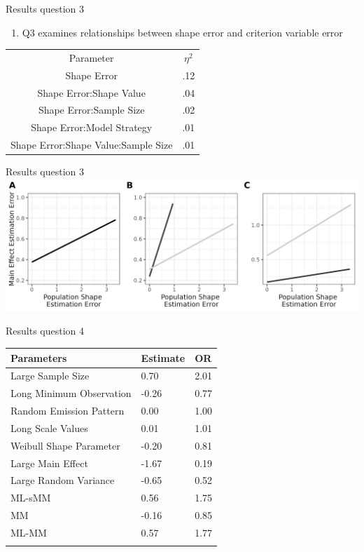 \documentclass[
  ignorenonframetext,
]{beamer}
\providecommand{\tightlist}{%
  \setlength{\itemsep}{0pt}\setlength{\parskip}{0pt}}
\begin{document}
\begin{frame}{Results question 3}
\label{results-question-3}
\begin{enumerate}
\tightlist
\item
  Q3 examines relationships between shape error and criterion variable
  error
\end{enumerate}

\begin{table}
    \centering
    \begin{tabular}{cc}
        Parameter & \(\eta^2\) \\
        Shape Error & .12 \\
        Shape Error:Shape Value & .04 \\
        Shape Error:Sample Size & .02\\
        Shape Error:Model Strategy & .01\\
        Shape Error:Shape Value:Sample Size & .01\\
    \end{tabular}
\end{table}
\end{frame}

\begin{frame}{Results question 3}
\label{results-question-3-1}
\includegraphics{figures/shapeEstimationError.png}
\end{frame}

\begin{frame}{Results question 4}
\label{results-question-4}
\begin{longtable}[]{@{}lll@{}}
\toprule\noalign{}
Parameters & Estimate & OR \\
\midrule\noalign{}
\endhead
Large Sample Size & 0.70 & 2.01 \\
Long Minimum Observation & -0.26 & 0.77 \\
Random Emission Pattern & 0.00 & 1.00 \\
Long Scale Values & 0.01 & 1.01 \\
Weibull Shape Parameter & -0.20 & 0.81 \\
Large Main Effect & -1.67 & 0.19 \\
Large Random Variance & -0.65 & 0.52 \\
ML-sMM & 0.56 & 1.75 \\
MM & -0.16 & 0.85 \\
ML-MM & 0.57 & 1.77 \\
\bottomrule\noalign{}
\end{longtable}
\end{frame}
\end{document}

